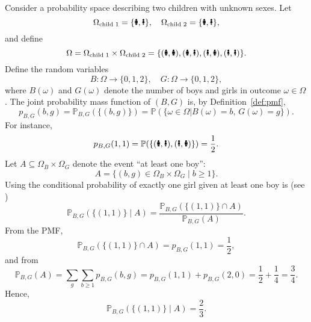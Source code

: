 \newpage
\begin{example}
	Consider a probability space describing two children with unknown sexes. Let
	\begin{equation}
		\Omega_{\text{child 1}} = \{\text{\Gentsroom}, \text{\Ladiesroom}\}, \quad
		\Omega_{\text{child 2}} = \{\text{\Gentsroom}, \text{\Ladiesroom}\},
	\end{equation}
	and define
	\begin{equation}
		\Omega = \Omega_{\text{child 1}} \times \Omega_{\text{child 2}} = 
		\{(\text{\Gentsroom},\text{\Gentsroom}), (\text{\Gentsroom},\text{\Ladiesroom}), (\text{\Ladiesroom},\text{\Gentsroom}), (\text{\Ladiesroom},\text{\Ladiesroom})\}.
	\end{equation}	
	Define the random variables
	\begin{equation}
		B : \Omega \to \{0,1,2\}, \quad G : \Omega \to \{0,1,2\},
	\end{equation}
	where $B(\omega)$ and $G(\omega)$ denote the number of boys and girls in outcome $\omega \in \Omega$.  
	The joint probability mass function of $(B,G)$ is, by Definition~\ref{def:pmf},
	\begin{equation}
		p_{B,G}(b,g) = \mathbb{P}_{B,G}(\{(b,g)\}) = \mathbb{P}(\{\omega \in \Omega | B(\omega) = b,\, G(\omega) = g\}).
	\end{equation}
	For instance,
	\begin{equation}
		p_{B,G}(1,1) = \mathbb{P}(\{(\text{\Gentsroom},\text{\Ladiesroom}), (\text{\Ladiesroom},\text{\Gentsroom})\}) = \frac{1}{2}.
	\end{equation}
	Let $A \subseteq \Omega_B \times \Omega_G$ denote the event ``at least one boy'':
	\begin{equation}
		A = \{(b,g) \in \Omega_B \times \Omega_G \mid b \ge 1\}.
	\end{equation}
	Using  the conditional probability of exactly one girl given at least one boy is (see )
	\begin{equation}
		\mathbb{P}_{B,G}(\{(1,1)\} \mid A) = \frac{\mathbb{P}_{B,G}(\{(1,1)\} \cap A)}{\mathbb{P}_{B,G}(A)}.
	\end{equation}
	From the PMF,
	\begin{equation}
		\mathbb{P}_{B,G}(\{(1,1)\} \cap A) = p_{B,G}(1,1) = \frac{1}{2},
	\end{equation}
	and from 
	\begin{equation}
		\mathbb{P}_{B,G}(A) = \sum_{g} \sum_{b \ge 1} p_{B,G}(b,g) = p_{B,G}(1,1) + p_{B,G}(2,0) = \frac{1}{2} + \frac{1}{4} = \frac{3}{4}.
	\end{equation}
	Hence,
	\begin{equation}
		\mathbb{P}_{B,G}(\{(1,1)\} \mid A) = \frac{2}{3}.
	\end{equation}
\end{example}


